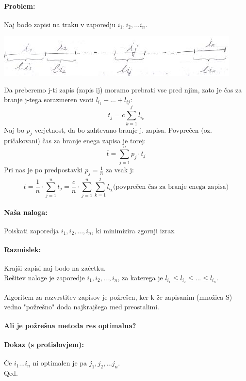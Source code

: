 \documentclass[a4paper,10pt]{article}
\begin{document}
\paragraph{Problem:}
Naj bodo zapisi na traku v zaporedju $i_1, i_2,... i_n$.
	\begin{center}
	\includegraphics{Slike/MagnetniTrak.jpg}
	\end{center}
Da preberemo j-ti zapis (zapis ij) moramo prebrati vse pred njim, zato je \v cas za branje j-tega sorazmeren vsoti $l_{i_1}+ ... + l_{ij}$:
$$
t_j = c \sum_{k=1}^{j} l_{i_k}
$$
Naj bo $p_j$ verjetnost, da bo zahtevano branje j. zapisa. Povpre\v cen (oz. pri\v cakovani) \v cas za branje enega zapisa je torej:
$$\overline{t} = \sum_{j=1}^{n} p_j \cdot t_j$$
Pri nas je po predpostavki $p_j = \frac{1}{n}$ za vsak j:
$$
t = \frac{1}{n} \cdot \sum_{j=1}^{n}t_j = \frac{c}{n} \cdot \sum_{j=1}^{n} \sum_{k=1}^{j} l_{i_k} \mbox{(povpre\v cen \v cas za branje enega zapisa)}
$$

\paragraph{Na\v sa naloga:}
Poiskati zaporedja $i_1, i_2, ..., i_n$, ki minimizira zgornji izraz. 

\paragraph{Razmislek:}
Kraj\v si zapisi naj bodo na za\v cetku.\\
Re\v sitev naloge je zaporedje $i_1, i_2,...,i_n$, za katerega je $l_{i_1} \leq l_{i_2} \leq ... \leq l_{i_n}$.\\
\\
Algoritem za razvrstitev zapisov je po\v zre\v sen, ker k \v ze zapisanim (mno\v zica S) vedno "po\v zre\v sno" doda najkraj\v sega med preostalimi.\\
\\
\textbf{Ali je po\v zre\v sna metoda res optimalna?}

\paragraph{Dokaz (s protislovjem):}
\v Ce $i_1...i_n$ ni optimalen je pa $j_1, j_2,... j_n$.\\
Qed.
\end{document}
